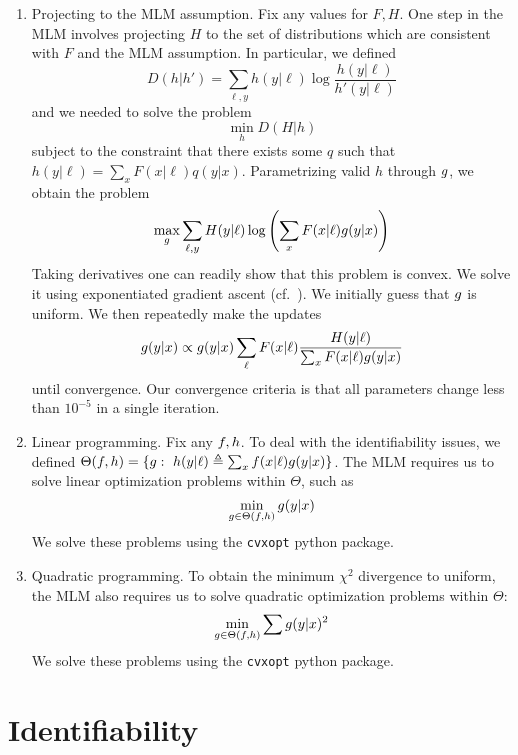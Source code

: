 \begin{enumerate}

    \item Projecting to the MLM assumption.  Fix any values for $F,H$.  One step in the MLM involves projecting $H$ to the set of distributions which are consistent with $F$ and the MLM assumption.  In particular, we defined
    \[
    D(h|h') = \sum_{\ell,y} h(y|\ell) \log \frac{h(y|\ell)}{h'(y|\ell)}
    \]
    and we needed to solve the problem
    \[
    \min_{h} D(H|h)
    \]
    subject to the constraint that there exists some $q$ such that $h(y|\ell)=\sum_x F(x|\ell)q(y|x)$.  Parametrizing valid $h$ through $g$, we obtain the problem
    \[
    \max_{g} \sum_{\ell,y} H(y|\ell) \log \left(\sum_x F(x|\ell) g(y|x)\right)
    \]
    Taking derivatives one can readily show that this problem is convex.  We solve it using exponentiated gradient ascent (cf.\ \cite{kivinen1995additive}).  We initially guess that $g$ is uniform.  We then repeatedly make the updates
    \begin{align*}
    g(y|x)  &\propto g(y|x)\sum_{\ell}F(x|\ell)\frac{H(y|\ell)}{\sum_x F(x|\ell)g(y|x)}\\
    \end{align*}
    until convergence.  Our convergence criteria is that all parameters change less than $10^{-5}$ in a single iteration.

    \item Linear programming.  Fix any $f,h$.  To deal with the identifiability issues, we defined $\Theta(\plx,\ply)=\{\pxy:\ \ply(y|\ell) \triangleq \sum_x \plx(x|\ell)\pxy(y|x)\}$.  The MLM requires us to solve linear optimization problems within $\Theta$, such as 
    \[
    \min_{g\in \Theta(f,h)} g(y|x) \\
    \]
    We solve these problems using the {\tt cvxopt} python package.

    \item Quadratic programming.  To obtain the minimum $\chi^2$ divergence to uniform, the MLM also requires us to solve quadratic optimization problems within $\Theta$:
    \[
    \min_{g \in \Theta(f,h)} \sum g(y|x)^2 \\
    \]
    We solve these problems using the {\tt cvxopt} python package.


\end{enumerate}

\section{Identifiability}

